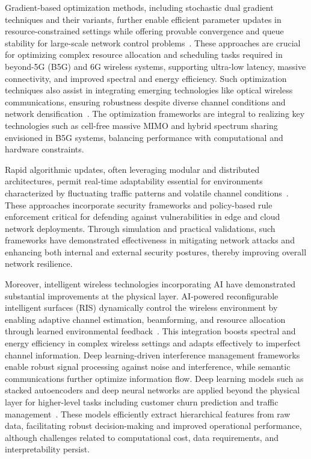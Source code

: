 \documentclass[sigconf]{acmart}
\begin{document}
Gradient-based optimization methods, including stochastic dual gradient techniques and their variants, further enable efficient parameter updates in resource-constrained settings while offering provable convergence and queue stability for large-scale network control problems~\cite{ref13,ref14}. These approaches are crucial for optimizing complex resource allocation and scheduling tasks required in beyond-5G (B5G) and 6G wireless systems, supporting ultra-low latency, massive connectivity, and improved spectral and energy efficiency. Such optimization techniques also assist in integrating emerging technologies like optical wireless communications, ensuring robustness despite diverse channel conditions and network densification~\cite{ref14}. The optimization frameworks are integral to realizing key technologies such as cell-free massive MIMO and hybrid spectrum sharing envisioned in B5G systems, balancing performance with computational and hardware constraints.

Rapid algorithmic updates, often leveraging modular and distributed architectures, permit real-time adaptability essential for environments characterized by fluctuating traffic patterns and volatile channel conditions~\cite{ref15}. These approaches incorporate security frameworks and policy-based rule enforcement critical for defending against vulnerabilities in edge and cloud network deployments. Through simulation and practical validations, such frameworks have demonstrated effectiveness in mitigating network attacks and enhancing both internal and external security postures, thereby improving overall network resilience.

Moreover, intelligent wireless technologies incorporating AI have demonstrated substantial improvements at the physical layer. AI-powered reconfigurable intelligent surfaces (RIS) dynamically control the wireless environment by enabling adaptive channel estimation, beamforming, and resource allocation through learned environmental feedback~\cite{ref16,ref49}. This integration boosts spectral and energy efficiency in complex wireless settings and adapts effectively to imperfect channel information. Deep learning-driven interference management frameworks enable robust signal processing against noise and interference, while semantic communications further optimize information flow. Deep learning models such as stacked autoencoders and deep neural networks are applied beyond the physical layer for higher-level tasks including customer churn prediction and traffic management~\cite{ref16}. These models efficiently extract hierarchical features from raw data, facilitating robust decision-making and improved operational performance, although challenges related to computational cost, data requirements, and interpretability persist.
\end{document}
